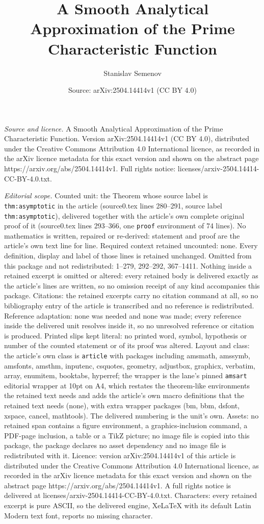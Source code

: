 \documentclass[10pt,a4paper]{amsart}
\title[A Smooth Analytical Approximation of the Prime Characteristi]{A Smooth Analytical Approximation of the Prime Characteristic Function}
\author{Stanislav Semenov}
\date{Source: arXiv:2504.14414v1 (CC BY 4.0)}
\begin{document}
\maketitle

\noindent\emph{Source and licence.} A Smooth Analytical Approximation of the Prime Characteristic Function. Version arXiv:2504.14414v1 (CC BY 4.0), distributed under the Creative Commons Attribution 4.0 International licence, as recorded in the arXiv licence metadata for this exact version and shown on the abstract page https://arxiv.org/abs/2504.14414v1. Full rights notice: licenses/arxiv-2504.14414-CC-BY-4.0.txt.\par\smallskip

\noindent\textit{Editorial scope.} Counted unit: the Theorem whose source label is \texttt{thm:asymptotic} in the article (source0.tex lines 280--291, source label \texttt{thm:asymptotic}), delivered together with the article's own complete original proof of it (source0.tex lines 293--366, one \texttt{proof} environment of 74 lines). No mathematics is written, repaired or re-derived: statement and proof are the article's own text line for line. Required context retained uncounted: none. Every definition, display and label of those lines is retained unchanged. Omitted from this package and not redistributed: 1--279, 292--292, 367--1411. Nothing inside a retained excerpt is omitted or altered: every retained body is delivered exactly as the article's lines are written, so no omission receipt of any kind accompanies this package. Citations: the retained excerpts carry no citation command at all, so no bibliography entry of the article is transcribed and no reference is redistributed. Reference adaptation: none was needed and none was made; every reference inside the delivered unit resolves inside it, so no unresolved reference or citation is produced. Printed slips kept literal: no printed word, symbol, hypothesis or number of the counted statement or of its proof was altered. Layout and class: the article's own class is \texttt{article} with packages including amsmath, amssymb, amsfonts, amsthm, inputenc, csquotes, geometry, adjustbox, graphicx, verbatim, array, enumitem, booktabs, hyperref; the wrapper is the lane's pinned \texttt{amsart} editorial wrapper at 10pt on A4, which restates the theorem-like environments the retained text needs and adds the article's own macro definitions that the retained text needs (none), with extra wrapper packages (bm, bbm, dsfont, xspace, cancel, mathtools). The delivered numbering is the unit's own. Assets: no retained span contains a figure environment, a graphics-inclusion command, a PDF-page inclusion, a table or a TikZ picture; no image file is copied into this package, the package declares no asset dependency and no image file is redistributed with it. Licence: version arXiv:2504.14414v1 of this article is distributed under the Creative Commons Attribution 4.0 International licence, as recorded in the arXiv licence metadata for this exact version and shown on the abstract page https://arxiv.org/abs/2504.14414v1. A full rights notice is delivered at licenses/arxiv-2504.14414-CC-BY-4.0.txt. Characters: every retained excerpt is pure ASCII, so the delivered engine, XeLaTeX with its default Latin Modern text font, reports no missing character.
\end{document}
